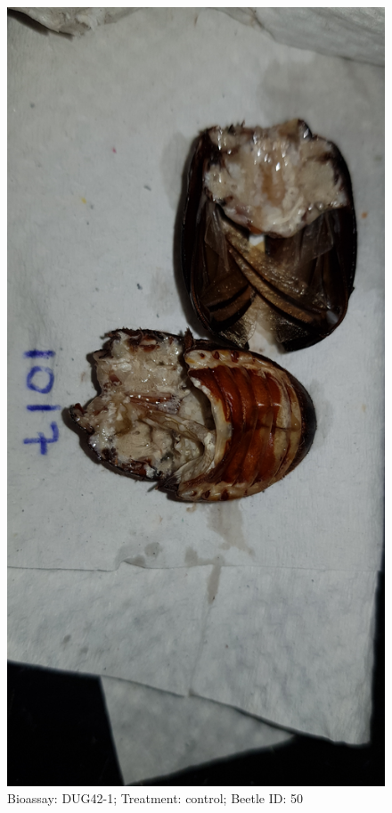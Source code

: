 \documentclass[11pt]{scrartcl}
\begin{document}
\begin{figure}[h!]
    \centering
    \includegraphics[width=\linewidth, height=\textheight, keepaspectratio]{uploads/btl.pm_image.950cdb8728985088.447567343220313031375f5265702d3120636f6e74726f6c2e6a7067.jpg}
    \caption{Bioassay: DUG42-1; Treatment: control; Beetle ID: 50}
\end{figure}
\clearpage
\end{document}
